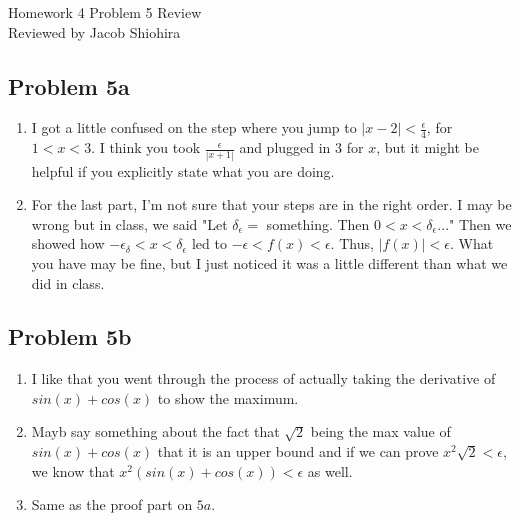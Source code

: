\documentclass{article}
\newcommand\abs[1]{\left|#1\right|}
\begin{document}

\begin{center}
Homework 4 Problem 5 Review\\
Reviewed by Jacob Shiohira
\end{center}

\subsection*{Problem 5a}
\begin{enumerate}
\item I got a little confused on the step where you jump to $\abs{x-2} < \frac{\epsilon}{4}$, for $1<x<3$. I think you took $\frac{\epsilon}{\abs{x+1}}$ and plugged in $3$ for $x$, but it might be helpful if you explicitly state what you are doing.
\item For the last part, I'm not sure that your steps are in the right order. I may be wrong but in class, we said "Let $\delta_\epsilon=$ something.  Then $0<x<\delta_\epsilon$..." Then we showed how $-\epsilon_\delta<x<\delta_\epsilon$ led to $-\epsilon<f(x)<\epsilon$. Thus, $\abs{f(x)} < \epsilon$. What you have may be fine, but I just noticed it was a little different than what we did in class.
\end{enumerate}

\subsection*{Problem 5b}
\begin{enumerate}
\item I like that you went through the process of actually taking the derivative of $sin(x)+cos(x)$ to show the maximum.
\item Mayb say something about the fact that $\sqrt{2}$ being the max value of $sin(x)+cos(x)$ that it is an upper bound and if we can prove $x^2\sqrt{2} < \epsilon$, we know that $x^2(sin(x)+cos(x)) < \epsilon$ as well.
\item Same as the proof part on $5a$.
\end{enumerate}

\end{document}
